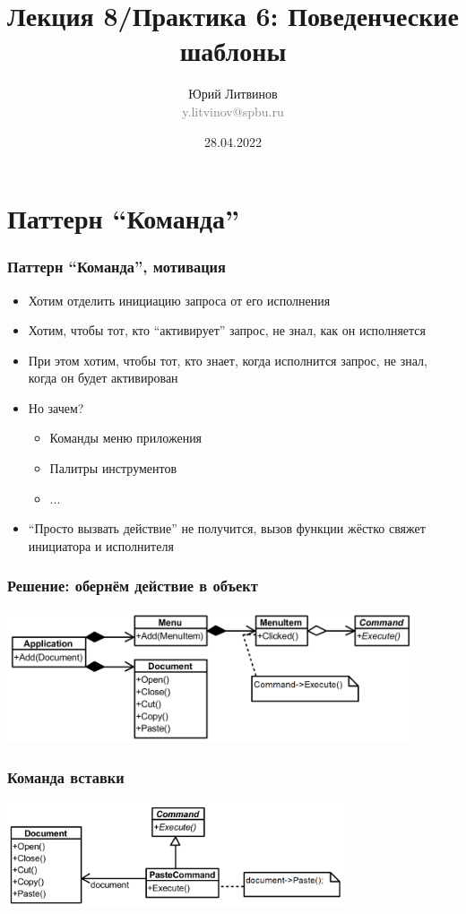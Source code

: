 \documentclass[xetex,mathserif,serif]{beamer}
\title[Шаблоны]{Лекция 8/Практика 6: Поведенческие шаблоны}
\author[Юрий Литвинов]{Юрий Литвинов\\\small{\textcolor{gray}{y.litvinov@spbu.ru}}}
\date{28.04.2022}
\begin{document}
    \frame{\titlepage}

    \section{Паттерн ``Команда''}

    \begin{frame}
        \frametitle{Паттерн ``Команда'', мотивация}
        \begin{itemize}
            \item Хотим отделить инициацию запроса от его исполнения
            \item Хотим, чтобы тот, кто ``активирует'' запрос, не знал, как он исполняется
            \item При этом хотим, чтобы тот, кто знает, когда исполнится запрос, не знал, когда он будет активирован
            \item Но зачем?
            \begin{itemize}
                \item Команды меню приложения
                \item Палитры инструментов
                \item ...
            \end{itemize}
            \item ``Просто вызвать действие'' не получится, вызов функции жёстко свяжет инициатора и исполнителя
        \end{itemize}
    \end{frame}

    \begin{frame}
        \frametitle{Решение: обернём действие в объект}
        \begin{center}
            \includegraphics[width=0.9\textwidth]{commandExample.png}
        \end{center}
    \end{frame}

    \begin{frame}
        \frametitle{Команда вставки}
        \begin{center}
            \includegraphics[width=0.75\textwidth]{pasteCommand.png}
        \end{center}
    \end{frame}
\end{document}
